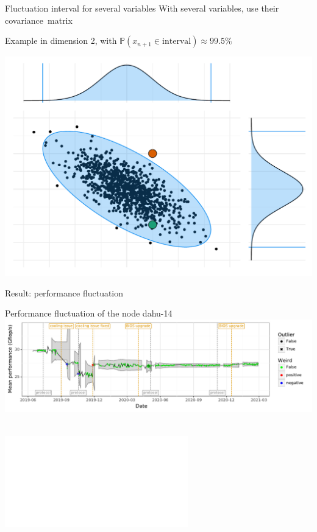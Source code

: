 \documentclass[10pt]{beamer}
\begin{document}
\begin{frame}{Fluctuation interval for several variables}
    With several variables, use their \alert{covariance~matrix}

    Example in dimension 2, with \(\mathbb{P}(x_{n+1} \in \text{interval}) \approx 99.5\%\)

    \begin{center}
        \includegraphics[width=0.8\linewidth]{img/experiment/non_regression/statistics/single_point.pdf}
    \end{center}
\end{frame}

\begin{frame}{Result: performance fluctuation}
    \begin{center}
        \begin{minipage}[t][.4\textheight][t]{\textwidth}
            Performance fluctuation of the node dahu-14\\
            \includegraphics[width=0.9\linewidth]{img/slides/evolution_dahu-14.pdf}
        \end{minipage}
        \begin{minipage}[t][.4\textheight][t]{\textwidth}
            \\
            \includegraphics<2>[width=0.9\linewidth]{img/slides/evolution_dahu-32.pdf}
        \end{minipage}
    \end{center}
\end{frame}
\end{document}
